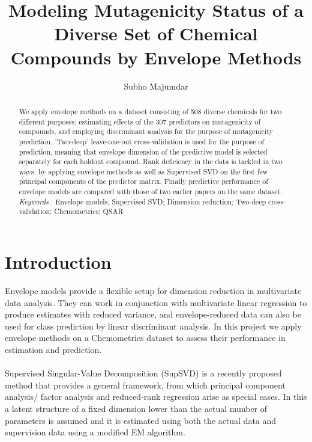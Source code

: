 \documentclass[11pt]{llncs}
\begin{document}
\title{Modeling Mutagenicity Status of a Diverse Set of Chemical Compounds by Envelope Methods}
\author{Subho Majumdar}
\maketitle

\begin{abstract}
We apply envelope methods on a dataset consisting of 508 diverse chemicals for two different purposes: estimating effects of the 307 predictors on mutagenicity of compounds, and employing discriminant analysis for the purpose of mutagenicity prediction. 'Two-deep' leave-one-out cross-validation is used for the purpose of prediction, meaning that envelope dimension of the predictive model is selected separately for each holdout compound. Rank deficiency in the data is tackled in two ways: by applying envelope methods as well as Supervised SVD on the first few principal components of the predictor matrix. Finally predictive performance of envelope models are compared with those of two earlier papers on the same dataset.\\

\textit{Keywords} : Envelope models; Supervised SVD; Dimension reduction; Two-deep cross-validation; Chemometrics; QSAR

\end{abstract}

\section{Introduction}
Envelope models \cite{cook} provide a flexible setup for dimension reduction in multivariate data analysis. They can work in conjunction with multivariate linear regression to produce estimates with reduced variance, and envelope-reduced data can also be used for class prediction by linear discriminant analysis. In this project we apply envelope methods on a Chemometrics dataset to assess their performance in estimation and prediction.

\paragraph{}Supervised Singular-Value Decomposition (SupSVD) is a recently proposed method \cite{supsvd} that provides a general framework, from which principal component analysis/ factor analysis and reduced-rank regression arise as special cases. In this a latent structure of a fixed dimension lower than the actual number of parameters is assumed and it is estimated using both the actual data and supervision data using a modified EM algorithm.
\end{document}
